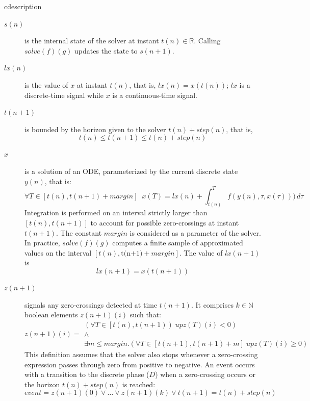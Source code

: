 \documentclass[11pt,titlepage,twoside]{report}
\newenvironment{cdescription}
  {\begin{divstyle}{cdescription}\begin{description}}
  {\end{description}\end{divstyle}}
\newenvironment{cdescription}
  {\begin{description}[leftmargin=3.5em,style=multiline]}
  {\end{description}}
\newcommand{\lx}{\ensuremath{\mathit{lx}}}
\newcommand{\Solve}[2]{\mathit{solve}({#1})({#2})}
\newcommand{\bR}{\mathbb{R}}
\newcommand{\bN}{\mathbb{N}}
\begin{document}
\begin{cdescription}
\item[$s(n)$]
is the internal state of the solver at instant $t(n) \in \bR$.
Calling $\Solve{f}{g}$ updates the state to $s(n+1)$.

\item[$\lx(n)$]
is the value of $x$ at instant $t(n)$, that is, $\lx(n) = x(t(n))$; $\lx$ is 
a discrete-time signal while $x$ is a continuous-time signal.

\item[$t(n+1)$]
is bounded by the horizon given to the solver $t(n) + step(n)$, that is,
\[t(n) \leq t(n+1) \leq t(n) + step(n)\]

\item[$x$]
is a solution of an ODE, parameterized by the current discrete state~$y(n)$, 
that is:
  \[\forall T \in [t(n), t(n+1) + margin]\;\;
        x(T) = \lx(n) + \int_{t(n)}^{T} f (y(n), \tau, x(\tau)))
        \,d\tau
  \]
Integration is performed on an interval strictly larger than 
\mbox{$[t(n),t(n+1)]$} to account for possible zero-crossings at instant 
$t(n+1)$.
The constant $margin$ is considered as a parameter of the solver.
In practice, $\Solve{f}{g}$ computes a finite sample of approximated values 
on the interval $[t(n), \mbox{t(n+1)} + margin]$.
The value of $\lx(n+1)$ is \[ \lx(n+1) = x(t(n+1)) \]

\item[$z(n+1)$]
signals any zero-crossings detected at time $t(n+1)$.
It comprises $k \in \bN$ boolean elements $z(n+1)(i)$ such that:
  \[
  z(n+1)(i) = %
    \begin{array}{l}
       (\forall T \in \left[t(n), t(n+1)\right) \; upz(T)(i) < 0) \\
       \wedge \\
       \exists m \leq \mathit{margin}.
          (\forall T \in [t(n+1), t(n+1)+m] \; upz(T)(i) \geq 0)
    \end{array}
  \]
This definition assumes that the solver also stops whenever a zero-crossing 
expression passes through zero from positive to negative.
An event occurs with a transition to the discrete phase ($D$) when a zero-crossing
occurs or the horizon $t(n)+step(n)$ is reached:
\[\mathit{event} = z(n+1)(0) \lor \dots \lor z(n+1)(k) \lor
                         t(n+1) = t(n) + step(n)
\]
\end{cdescription}
\end{document}

